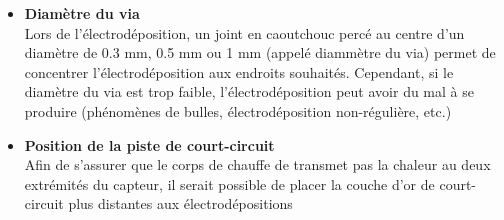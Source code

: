 \begin{itemize}
    \item \textbf{Diamètre du via}\\
          Lors de l'électrodéposition, un joint en caoutchouc percé au centre d'un diamètre de 0.3 mm, 0.5 mm ou 1 mm (appelé diammètre du via) permet de concentrer
          l'électrodéposition aux endroits souhaités. Cependant, si le diamètre du via est trop faible, l'électrodéposition peut avoir du mal à
          se produire (phénomènes de bulles, électrodéposition non-régulière, etc.)\\
          
    \item \textbf{Position de la piste de court-circuit}\\
          Afin de s'assurer que le corps de chauffe de transmet pas la chaleur au deux extrémités du capteur, il serait possible de placer la couche
          d'or de court-circuit plus distantes aux électrodépositions
\end{itemize}

